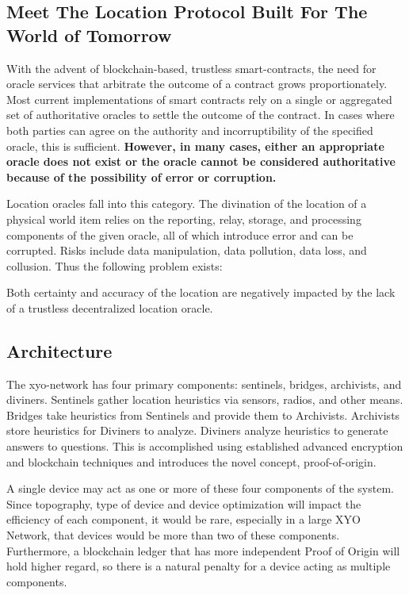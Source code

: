 \documentclass{article}
\begin{document}
\subsection {Meet The Location Protocol Built For The World of Tomorrow}
With the advent of blockchain-based, trustless \glspl{smart-contract}, the need for \gls{oracle} services that arbitrate the outcome of a contract grows proportionately. Most current implementations of smart contracts rely on a single or aggregated set of authoritative oracles to settle the outcome of the contract. In cases where both parties can agree on the authority and incorruptibility of the specified oracle, this is sufficient. \textbf{However, in many cases, either an appropriate oracle does not exist or the oracle cannot be considered authoritative because of the possibility of error or corruption.}

Location oracles fall into this category. The divination of the location of a physical world item relies on the reporting, relay, storage, and processing components of the given oracle, all of which introduce error and can be corrupted. Risks include data manipulation, data pollution, data loss, and collusion. Thus the following problem exists:

Both \gls{certainty} and \gls{accuracy} of the location are negatively impacted by the lack of a trustless decentralized location oracle.

\subsection {Architecture}
The \Gls{xyo-network} has four primary components: \Glspl{sentinel}, \Glspl{bridge}, \Glspl{archivist}, and \Glspl{diviner}. Sentinels gather location \glspl{heuristic} via sensors, radios, and other means. Bridges take heuristics from Sentinels and provide them to Archivists. Archivists store heuristics for Diviners to analyze. Diviners analyze heuristics to generate answers to questions. This is accomplished using established advanced encryption and blockchain techniques and introduces the novel concept, \Gls{proof-of-origin}.

A single device may act as one or more of these four components of the system. Since topography, type of device and device optimization will impact the efficiency of each component, it would be rare, especially in a large XYO Network, that devices would be more than two of these components. Furthermore, a blockchain ledger that has more independent Proof of Origin will hold higher regard, so there is a natural penalty for a device acting as multiple components.
\end{document}
